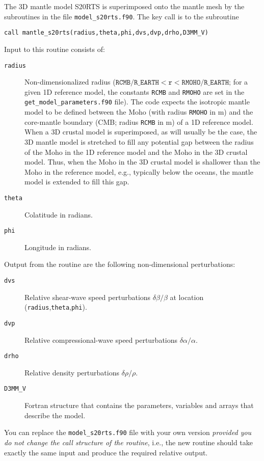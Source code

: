 The 3D mantle model S20RTS \citep{RiVaWo99} is superimposed onto
the mantle mesh by the subroutines in the file \texttt{model\_s20rts.f90}. The
key call is to the subroutine
\begin{verbatim}
call mantle_s20rts(radius,theta,phi,dvs,dvp,drho,D3MM_V)
\end{verbatim}

\noindent
Input to this routine consists of:
\begin{description}
\item [{\texttt{radius}}] Non-dimensionalized radius ($\texttt{RCMB/R\_ EARTH}<\texttt{r}<\texttt{RMOHO/R\_ EARTH}$;
for a given 1D reference model, the constants \texttt{RCMB} and \texttt{RMOHO}
are set in the \texttt{\small get\_model\_parameters}\texttt{.f90}
file). The code expects the isotropic mantle model to be defined between
the Moho (with radius \texttt{RMOHO} in m) and the core-mantle boundary
(CMB; radius \texttt{RCMB} in m) of a 1D reference model. When a 3D
crustal model is superimposed, as will usually be the case, the 3D
mantle model is stretched to fill any potential gap between the radius
of the Moho in the 1D reference model and the Moho in the 3D crustal
model. Thus, when the Moho in the 3D crustal model is shallower than
the Moho in the reference model, e.g., typically below the oceans,
the mantle model is extended to fill this gap.
\item [{\texttt{theta}}] Colatitude in radians.
\item [{\texttt{phi}}] Longitude in radians.
\end{description}
%
Output from the routine are the following non-dimensional perturbations:
\begin{description}
\item [{\texttt{dvs}}] Relative shear-wave speed perturbations $\delta\beta/\beta$
at location (\texttt{radius},\texttt{theta},\texttt{phi}).
\item [{\texttt{dvp}}] Relative compressional-wave speed perturbations
$\delta\alpha/\alpha$.
\item [{\texttt{drho}}] Relative density perturbations $\delta\rho/\rho$.
\item [{\texttt{D3MM\_V}}] Fortran structure that contains the parameters,
variables and arrays that describe the model.
\end{description}
You can replace the \texttt{model\_s20rts.f90} file with your own
version \textit{provided you do not change the call structure of the
routine}, i.e., the new routine should take exactly the same input
and produce the required relative output.

